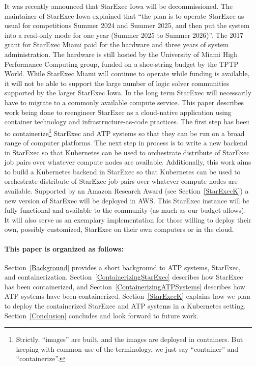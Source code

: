 \documentclass{easychair}
\begin{document}
It was recently announced that StarExec Iowa will be decommissioned. 
The maintainer of StarExec Iowa explained that ``the plan is to operate StarExec as usual for 
competitions Summer 2024 and Summer 2025, and then put the system into a read-only mode for one 
year (Summer 2025 to Summer 2026)''.
The 2017 grant for StarExec Miami paid for the hardware and three years of system administration.
The hardware is still hosted by the University of Miami High Performance Computing group,
funded on a shoe-string budget by the TPTP World.
While StarExec Miami will continue to operate while funding is available, it will not be able
to support the large number of logic solver communities supported by the larger StarExec Iowa.
In the long term StarExec will necessarily have to migrate to a commonly available compute service.
This paper describes work being done to reengineer StarExec as a cloud-native application using
container technology and infrastructure-as-code practices.
The first step has been to containerize\footnote{%
Strictly, ``images'' are built, and the images are deployed in containers. 
But keeping with common use of the terminology, we just say ``container'' and ``containerize''.} 
StarExec and ATP systems so that they can be run on a broad range of computer platforms.
The next step in process is to write a new backend in StarExec so that Kubernetes can be used to
orchestrate distribute of StarExec job pairs over whatever compute nodes are available.
Additionally, this work aims to build a Kubernetes backend in StarExec so that Kubernetes can
be used to orchestrate distribute of StarExec job pairs over whatever compute nodes are available.
Supported by an Amazon Research Award (see Section~\ref{StarExecK}) a new version of StarExec
will be deployed in AWS.
This StarExec instance will be fully functional and available to the community (as much as our 
budget allows). 
It will also serve as an exemplary implementation for those willing to deploy their own, possibly 
customized, StarExec on their own computers or in the cloud.

\paragraph{This paper is organized as follows:}
Section~\ref{Background} provides a short background to ATP systems, StarExec, and 
containerization.
Section~\ref{ContainerizingStarExec} describes how StarExec has been containerized, and
Section~\ref{ContainerizingATPSystems} describes how ATP systems have been containerized.
Section~\ref{StarExecK} explains how we plan to deploy the containerized StarExec
and ATP systems in a Kubernetes setting.
Section~\ref{Conclusion} concludes and look forward to future work.
\end{document}

